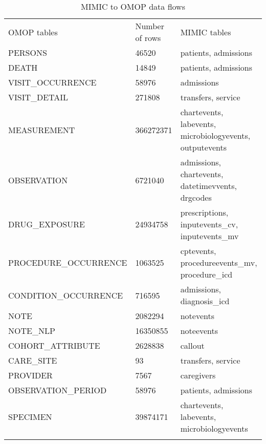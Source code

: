\begin{table*}[t]
\caption{MIMIC to OMOP data flows}
\begin{tabular}{@{}lll@{}}\toprule
OMOP tables           & Number of rows & MIMIC tables                                             \\\colrule
PERSONS               & 46520          & patients, admissions                                     \\
DEATH                 & 14849          & patients, admissions                                     \\
VISIT\_OCCURRENCE     & 58976          & admissions                                               \\
VISIT\_DETAIL         & 271808         & transfers, service                                       \\
MEASUREMENT           & 366272371      & chartevents, labevents, microbiologyevents, outputevents \\
OBSERVATION           & 6721040        & admissions, chartevents, datetimevvents, drgcodes        \\
DRUG\_EXPOSURE        & 24934758       & prescriptions, inputevents\_cv, inputevents\_mv          \\
PROCEDURE\_OCCURRENCE & 1063525        & cptevents, procedureevents\_mv, procedure\_icd           \\
CONDITION\_OCCURRENCE & 716595         & admissions, diagnosis\_icd                               \\
NOTE                  & 2082294        & notevents                                                \\
NOTE\_NLP             & 16350855       & noteevents                                               \\
COHORT\_ATTRIBUTE     & 2628838        & callout                                                  \\
CARE\_SITE            & 93             & transfers, service                                       \\
PROVIDER              & 7567           & caregivers                                               \\
OBSERVATION\_PERIOD   & 58976          & patients, admissions                                     \\
SPECIMEN              & 39874171       & chartevents, labevents, microbiologyevents               \\\botrule
\end{tabular}
\label{table:dispatch}
\end{table*}
 

